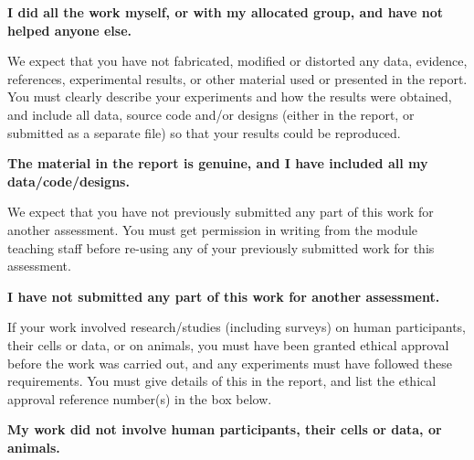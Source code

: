 \textbf{I did all the work myself, or with my allocated group, and have not helped anyone else.}

We expect that you have not fabricated, modified or distorted any data, evidence, references, experimental results, or other material used or presented in the report. You must clearly describe your experiments and how the results were obtained, and include all data, source code and/or designs (either in the report, or submitted as a separate file) so that your results could be reproduced.

\textbf{The material in the report is genuine, and I have included all my data/code/designs.}

We expect that you have not previously submitted any part of this work for another assessment. You must get permission in writing from the module teaching staff before re-using any of your previously submitted work for this assessment.

\textbf{I have not submitted any part of this work for another assessment.}

If your work involved research/studies (including surveys) on human participants, their cells or data, or on animals, you must have been granted ethical approval before the work was carried out, and any experiments must have followed these requirements. You must give details of this in the report, and list the ethical approval reference number(s) in the box below.

\textbf{My work did not involve human participants, their cells or data, or animals.}
